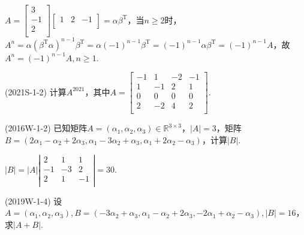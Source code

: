 \documentclass[lang=cn,newtx,10pt,scheme=chinese]{elegantbook}
\begin{document}
\begin{solution}
    $
    A = 
    \left[
    \begin{matrix}
        3 \\
        -1 \\
        2 \\
    \end{matrix}
    \right]
    \left[
    \begin{matrix}
        1 & 2 & -1 \\
    \end{matrix}
    \right]
    = \alpha \beta^{\mathrm{T}}
    $，当$n \ge 2$时，$A^n = \alpha (\beta^{\mathrm{T}} \alpha)^{n-1} \beta^{\mathrm{T}} = \alpha (-1)^{n-1} \beta^{\mathrm{T}} = (-1)^{n-1} \alpha \beta^{\mathrm{T}} = (-1)^{n-1} A$，故$A^n = (-1)^{n-1} A, n \ge 1$.
\end{solution}

\begin{exercise}
    (2021S-1-2) 计算$A^{2021}$，其中$A =  
    \left[
    \begin{matrix}
        -1 & 1 & -2 & -1 \\
        1 & -1 & 2 & 1 \\
        0 & 0 & 0 & 0 \\
        2 & -2 & 4 & 2 \\
    \end{matrix}
    \right]
    $.
\end{exercise}

\begin{example}
    (2016W-1-2) 已知矩阵$A = (\alpha_1,\alpha_2,\alpha_3) \in \mathbb{R}^{3 \times 3}$，$\left|A\right|=3$，矩阵$B = (2 \alpha_1 - \alpha_2 + 2 \alpha_3, \alpha_1 - 3 \alpha_2 + \alpha_3, \alpha_1 + 2 \alpha_2 - \alpha_3)$，计算$\left|B\right|$.
\end{example}

\begin{solution}
    $
    \left|B\right| = \left|A\right|
    \left|
    \begin{matrix}
        2 & 1 & 1 \\
        -1 & -3 & 2 \\
        2 & 1 & -1 \\
    \end{matrix}
    \right|
    = 30.
    $
\end{solution}

\begin{exercise}
    (2019W-1-4) 设$A = (\alpha_1, \alpha_2, \alpha_3),B = (-3 \alpha_2 + \alpha_3, \alpha_1 - \alpha_2 + 2 \alpha_3, -2 \alpha_1 + \alpha_2 - \alpha_3), \left|B\right| = 16$，求$\left|A+B\right|$.
\end{exercise}
\end{document}

